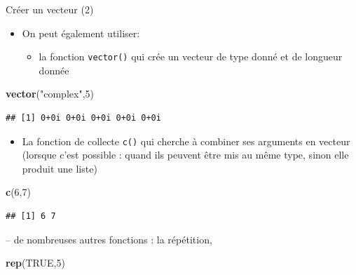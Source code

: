 \documentclass[
  ignorenonframetext,
]{beamer}
\newenvironment{Shaded}{\begin{snugshade}}{\end{snugshade}}
\newcommand{\ConstantTok}[1]{\textcolor[rgb]{0.56,0.35,0.01}{#1}}
\newcommand{\DecValTok}[1]{\textcolor[rgb]{0.00,0.00,0.81}{#1}}
\newcommand{\FunctionTok}[1]{\textcolor[rgb]{0.13,0.29,0.53}{\textbf{#1}}}
\newcommand{\NormalTok}[1]{#1}
\newcommand{\StringTok}[1]{\textcolor[rgb]{0.31,0.60,0.02}{#1}}
\providecommand{\tightlist}{%
  \setlength{\itemsep}{0pt}\setlength{\parskip}{0pt}}
\begin{document}
\begin{frame}[fragile]{Créer un vecteur (2)}
\protect\hypertarget{cruxe9er-un-vecteur-2}{}
\begin{itemize}
\tightlist
\item
  On peut également utiliser:

  \begin{itemize}
  \tightlist
  \item
    la fonction \texttt{vector()} qui crée un vecteur de type donné et
    de longueur donnée
  \end{itemize}
\end{itemize}

\tiny

\begin{Shaded}
\begin{Highlighting}[]
\FunctionTok{vector}\NormalTok{(}\StringTok{"complex"}\NormalTok{,}\DecValTok{5}\NormalTok{)}
\end{Highlighting}
\end{Shaded}

\begin{verbatim}
## [1] 0+0i 0+0i 0+0i 0+0i 0+0i
\end{verbatim}

\normalsize

\begin{itemize}
\tightlist
\item
  La fonction de collecte \texttt{c()} qui cherche à combiner ses
  arguments en vecteur (lorsque c'est possible : quand ils peuvent être
  mis au même type, sinon elle produit une liste)
\end{itemize}

\tiny

\begin{Shaded}
\begin{Highlighting}[]
\FunctionTok{c}\NormalTok{(}\DecValTok{6}\NormalTok{,}\DecValTok{7}\NormalTok{)}
\end{Highlighting}
\end{Shaded}

\begin{verbatim}
## [1] 6 7
\end{verbatim}

\normalsize

-- de nombreuses autres fonctions : la répétition,

\tiny

\begin{Shaded}
\begin{Highlighting}[]
\FunctionTok{rep}\NormalTok{(}\ConstantTok{TRUE}\NormalTok{,}\DecValTok{5}\NormalTok{)}
\end{Highlighting}
\end{Shaded}


\end{frame}
\end{document}
